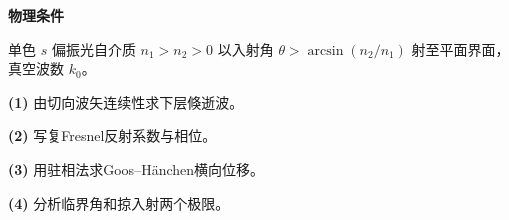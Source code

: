 \textbf{物理条件}\par 单色 \(s\) 偏振光自介质 \(n_1>n_2>0\) 以入射角 \(\theta>\arcsin(n_2/n_1)\) 射至平面界面，真空波数 \(k_0\)。
\par\noindent\textbf{(1)} 由切向波矢连续性求下层倏逝波。
\par\noindent\textbf{(2)} 写复Fresnel反射系数与相位。
\par\noindent\textbf{(3)} 用驻相法求Goos–Hänchen横向位移。
\par\noindent\textbf{(4)} 分析临界角和掠入射两个极限。
